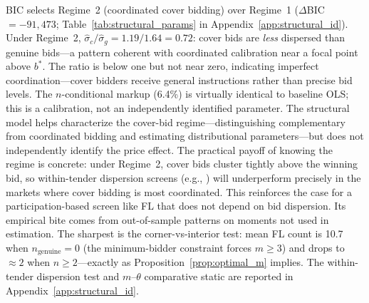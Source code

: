 BIC selects Regime~2 (coordinated cover bidding) over Regime~1
($\Delta$BIC~$= -91{,}473$;
Table~\ref{tab:structural_params} in
Appendix~\ref{app:structural_id}). Under Regime~2,
$\hat{\sigma}_c / \hat{\sigma}_g = 1.19/1.64 = 0.72$: cover bids are
\emph{less} dispersed than genuine bids---a pattern coherent with
coordinated calibration near a focal point above $b^*$. The ratio is below one but
not near zero, indicating imperfect coordination---cover bidders receive
general instructions rather than precise bid levels. The $n$-conditional markup (6.4\%) is virtually identical to baseline
OLS; this is a calibration, not an independently identified parameter.
The structural model helps characterize the cover-bid regime---distinguishing complementary from coordinated bidding and
estimating distributional parameters---but does not independently
identify the price effect. The practical payoff of
knowing the regime is concrete: under Regime~2, cover bids cluster
tightly above the winning bid, so within-tender dispersion screens
(e.g., \citealt{imhof2019detecting}) will underperform precisely in
the markets where cover bidding is most coordinated. This reinforces
the case for a participation-based screen like FL that does not depend
on bid dispersion. Its empirical bite comes from
out-of-sample patterns on moments not used in estimation. The
sharpest is the corner-vs-interior test: mean FL count is 10.7 when
$n_{\text{genuine}} = 0$ (the minimum-bidder constraint forces $m
\geq 3$) and drops to $\approx 2$ when $n \geq 2$---exactly as
Proposition~\ref{prop:optimal_m} implies. The within-tender
dispersion test and $m$--$\theta$ comparative static are reported in
Appendix~\ref{app:structural_id}.
